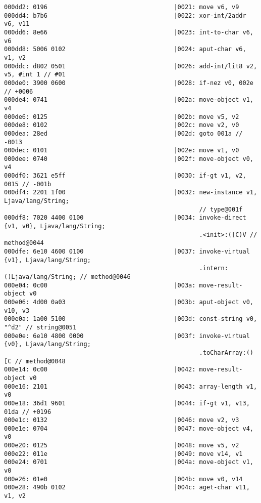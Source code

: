 \begin{lstlisting}
000dd2: 0196                                   |0021: move v6, v9
000dd4: b7b6                                   |0022: xor-int/2addr v6, v11
000dd6: 8e66                                   |0023: int-to-char v6, v6
000dd8: 5006 0102                              |0024: aput-char v6, v1, v2
000ddc: d802 0501                              |0026: add-int/lit8 v2, v5, #int 1 // #01
000de0: 3900 0600                              |0028: if-nez v0, 002e // +0006
000de4: 0741                                   |002a: move-object v1, v4
000de6: 0125                                   |002b: move v5, v2
000de8: 0102                                   |002c: move v2, v0
000dea: 28ed                                   |002d: goto 001a // -0013
000dec: 0101                                   |002e: move v1, v0
000dee: 0740                                   |002f: move-object v0, v4
000df0: 3621 e5ff                              |0030: if-gt v1, v2, 0015 // -001b
000df4: 2201 1f00                              |0032: new-instance v1, Ljava/lang/String;
                                                      // type@001f
000df8: 7020 4400 0100                         |0034: invoke-direct {v1, v0}, Ljava/lang/String;
                                                      .<init>:([C)V // method@0044
000dfe: 6e10 4600 0100                         |0037: invoke-virtual {v1}, Ljava/lang/String;
                                                      .intern:()Ljava/lang/String; // method@0046
000e04: 0c00                                   |003a: move-result-object v0
000e06: 4d00 0a03                              |003b: aput-object v0, v10, v3
000e0a: 1a00 5100                              |003d: const-string v0, "^d2" // string@0051
000e0e: 6e10 4800 0000                         |003f: invoke-virtual {v0}, Ljava/lang/String;
                                                      .toCharArray:()[C // method@0048
000e14: 0c00                                   |0042: move-result-object v0
000e16: 2101                                   |0043: array-length v1, v0
000e18: 36d1 9601                              |0044: if-gt v1, v13, 01da // +0196
000e1c: 0132                                   |0046: move v2, v3
000e1e: 0704                                   |0047: move-object v4, v0
000e20: 0125                                   |0048: move v5, v2
000e22: 011e                                   |0049: move v14, v1
000e24: 0701                                   |004a: move-object v1, v0
000e26: 01e0                                   |004b: move v0, v14
000e28: 490b 0102                              |004c: aget-char v11, v1, v2

\end{lstlisting}

